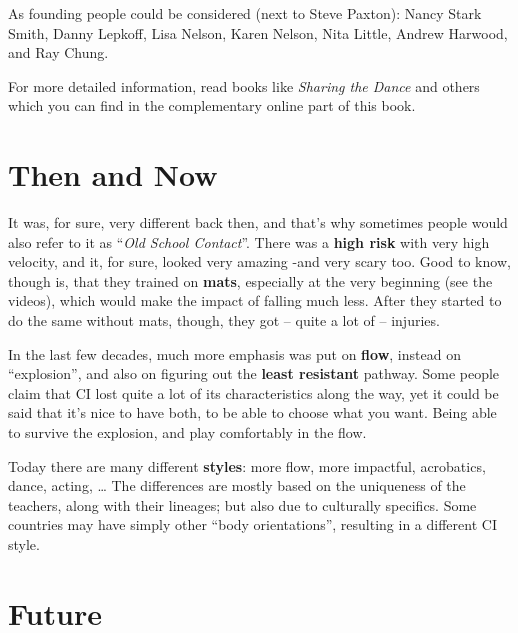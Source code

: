 As founding people could be considered (next to Steve Paxton): Nancy Stark Smith, Danny Lepkoff, Lisa Nelson, Karen Nelson, Nita Little, Andrew Harwood, and Ray Chung.

For more detailed information, read books like \textit{Sharing the Dance} and others which you can find in the complementary online part of this book.

\section{Then and Now}\label{sec:then-and-now}

It was, for sure, very different back then, and that's why sometimes people would also refer to it as ``\textit{Old School Contact}''.
There was a \textbf{high risk} with very high velocity, and it, for sure, looked very amazing -and very scary too.
Good to know, though is, that they trained on \textbf{mats}, especially at the very beginning (see the videos), which would make the impact of falling much less.
After they started to do the same without mats, though, they got -- quite a lot of -- injuries.

In the last few decades, much more emphasis was put on \textbf{flow}, instead on ``explosion'', and also on figuring out the \textbf{least resistant} pathway.
Some people claim that CI lost quite a lot of its characteristics along the way, yet it could be said that it's nice to have both, to be able to choose what you want.
Being able to survive the explosion, and play comfortably in the flow.

Today there are many different \textbf{styles}: more flow, more impactful, acrobatics, dance, acting, \ldots
The differences are mostly based on the uniqueness of the teachers, along with their lineages; but also due to culturally specifics.
Some countries may have simply other ``body orientations'', resulting in a different CI style.

\section{Future}\label{sec:future}

